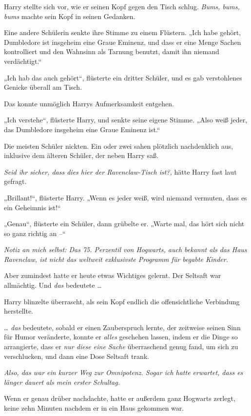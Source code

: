 {Harry stellte sich vor, wie er seinen Kopf gegen den Tisch schlug. \emph{Bums, bums, bums} machte sein Kopf in seinen Gedanken.

Eine andere Schülerin senkte ihre Stimme zu einem Flüstern. „Ich habe gehört, Dumbledore ist insgeheim eine Graue Eminenz, und dass er eine Menge Sachen kontrolliert und den Wahnsinn als Tarnung benutzt, damit ihn niemand verdächtigt.“

„Ich hab das auch gehört“, flüsterte ein dritter Schüler, und es gab verstohlenes Genicke überall am Tisch.

Das konnte unmöglich Harrys Aufmerksamkeit entgehen.

„Ich verstehe“, flüsterte Harry, und senkte seine eigene Stimme. „Also weiß jeder, das Dumbledore insgeheim eine Graue Eminenz ist.“

Die meisten Schüler nickten. Ein oder zwei sahen plötzlich nachdenklich aus, inklusive dem älteren Schüler, der neben Harry saß.

\emph{Seid ihr sicher, dass dies hier der Ravenclaw-Tisch ist?,} hätte Harry fast laut gefragt.

„Brillant!“, flüsterte Harry. „Wenn es jeder weiß, wird niemand vermuten, dass es ein Geheimnis ist!“

„Genau“, flüsterte ein Schüler, dann grübelte er. „Warte mal, das hört sich nicht so ganz richtig an --“

\emph{Notiz an mich selbst: Das 75. Perzentil von Hogwarts, auch bekannt als das Haus Ravenclaw, ist nicht das weltweit exklusivste Programm für begabte Kinder.}

Aber zumindest hatte er heute etwas Wichtiges gelernt. Der Seltsaft war allmächtig. Und \emph{das} bedeutete …

Harry blinzelte überrascht, als sein Kopf endlich die offensichtliche Verbindung herstellte.

… \emph{das} bedeutete, sobald er einen Zauberspruch lernte, der zeitweise seinen Sinn für Humor veränderte, konnte er \emph{alles} geschehen lassen, indem er die Dinge so arrangierte, dass er \emph{nur diese eine Sache} überraschend genug fand, um sich zu verschlucken, und dann eine Dose Seltsaft trank.

\emph{Also, das war ein kurzer Weg zur Omnipotenz. Sogar ich hatte erwartet, dass es länger dauert als mein erster Schultag.}

Wenn er genau drüber nachdachte, hatte er außerdem ganz Hogwarts zerlegt, keine zehn Minuten nachdem er in ein Haus gekommen war.

}
